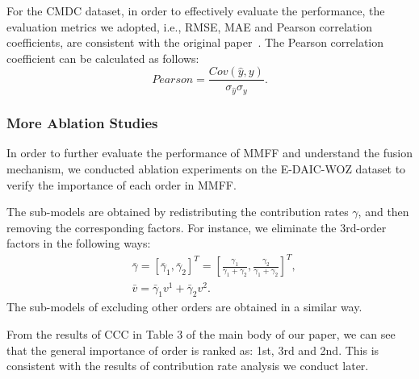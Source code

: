 \documentclass{article}
\begin{document}
For the CMDC dataset, in order to effectively evaluate the performance, the evaluation metrics we adopted, i.e., RMSE, MAE and Pearson correlation coefficients, are consistent with the original paper~\cite{CMDC}. The Pearson correlation coefficient can be calculated as follows:
\begin{equation}
    Pearson = \frac{Cov(\hat{y},y)}{\sigma_{\hat{y}}\sigma_y}.
\end{equation}


\subsubsection{More Ablation Studies}
In order to further evaluate the performance of MMFF and understand the fusion mechanism, we conducted ablation experiments on the E-DAIC-WOZ dataset to verify the importance of each order in MMFF. 

The sub-models are obtained by redistributing the contribution rates $\gamma$, and then removing the corresponding factors. For instance, we eliminate the 3rd-order factors in the following ways:
\begin{equation}
    \begin{split}
	& \bar{\gamma} = [\bar{\gamma}_1,\bar{\gamma}_2]^T = [\frac{\gamma_1}{\gamma_1+\gamma_2},\frac{\gamma_2}{\gamma_1+\gamma_2}]^T, \\
	& \bar{v} = \bar{\gamma}_1v^1 + \bar{\gamma}_2v^2.
	\end{split}
\end{equation}
The sub-models of excluding other orders are obtained in a similar way.

From the results of CCC in Table 3 of the main body of our paper, we can see that the general importance of order is ranked as: 1st, 3rd and 2nd. This is consistent with the results of contribution rate analysis we conduct later.
\end{document}
